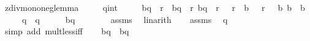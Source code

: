 \begin{isabellebody}
\endisatagproof
{\isafoldproof}%
%
\isadelimproof
\isanewline
%
\endisadelimproof
\isanewline
{}\isamarkupfalse%
\ zdiv{\isacharunderscore}{\kern0pt}mono{}{\isacharunderscore}{\kern0pt}neg{\isacharunderscore}{\kern0pt}lemma{\isacharcolon}{\kern0pt}\isanewline
\ \ \ \ \ q{\isacharprime}{\kern0pt}{\isacharcolon}{\kern0pt}{\isacharcolon}{\kern0pt}int\isanewline
\ \ \ \ \ {\isachardoublequoteopen}b{\isacharasterisk}{\kern0pt}q\ {\isacharplus}{\kern0pt}\ r\ {\isacharequal}{\kern0pt}\ b{\isacharprime}{\kern0pt}{\isacharasterisk}{\kern0pt}q{\isacharprime}{\kern0pt}\ {\isacharplus}{\kern0pt}\ r{\isacharprime}{\kern0pt}{\isachardoublequoteclose}\ {\isachardoublequoteopen}b{\isacharprime}{\kern0pt}{\isacharasterisk}{\kern0pt}q{\isacharprime}{\kern0pt}\ {\isacharplus}{\kern0pt}\ r{\isacharprime}{\kern0pt}\ {\isacharless}{\kern0pt}\ {}{\isachardoublequoteclose}\ {\isachardoublequoteopen}r\ {\isacharless}{\kern0pt}\ b{\isachardoublequoteclose}\ {\isachardoublequoteopen}{}\ {\isasymle}\ r{\isacharprime}{\kern0pt}{\isachardoublequoteclose}\ {\isachardoublequoteopen}{}\ {\isacharless}{\kern0pt}\ b{\isacharprime}{\kern0pt}{\isachardoublequoteclose}\ {\isachardoublequoteopen}b{\isacharprime}{\kern0pt}\ {\isasymle}\ b{\isachardoublequoteclose}\isanewline
\ \ \ \ \ {\isachardoublequoteopen}q{\isacharprime}{\kern0pt}\ {\isasymle}\ q{\isachardoublequoteclose}\isanewline
%
\isadelimproof
%
\endisadelimproof
%
\isatagproof
{}\isamarkupfalse%
\ {\isacharminus}{\kern0pt}\isanewline
\ \ \isamarkupfalse%
\ {\isachardoublequoteopen}b{\isacharprime}{\kern0pt}{\isacharasterisk}{\kern0pt}q{\isacharprime}{\kern0pt}\ {\isacharless}{\kern0pt}\ {}{\isachardoublequoteclose}\isanewline
\ \ \ \ \isamarkupfalse%
\ assms\ \isamarkupfalse%
\ linarith\isanewline
\ \ \isamarkupfalse%
\ assms\ \isamarkupfalse%
\ {\isachardoublequoteopen}q{\isacharprime}{\kern0pt}\ {\isasymle}\ {}{\isachardoublequoteclose}\isanewline
\ \ \ \ \isamarkupfalse%
\ {\isacharparenleft}{\kern0pt}simp\ add{\isacharcolon}{\kern0pt}\ mult{\isacharunderscore}{\kern0pt}less{\isacharunderscore}{\kern0pt}{}{\isacharunderscore}{\kern0pt}iff{\isacharparenright}{\kern0pt}\isanewline
\ \ \isamarkupfalse%
\ {\isachardoublequoteopen}b{\isacharasterisk}{\kern0pt}q{\isacharprime}{\kern0pt}\ {\isasymle}\ b{\isacharprime}{\kern0pt}{\isacharasterisk}{\kern0pt}q{\isacharprime}{\kern0pt}{\isachardoublequoteclose}\isanewline

\end{isabellebody}
